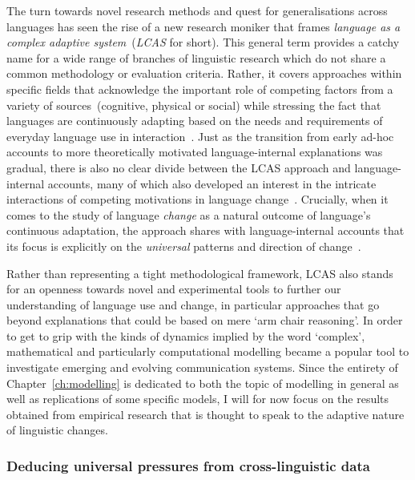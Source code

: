 The turn towards novel research methods and quest for generalisations across languages has seen the rise of a new research moniker that frames \emph{language as a complex adaptive system}~(\emph{LCAS} for short). This general term provides a catchy name for a wide range of branches of linguistic research which do not share a common methodology or evaluation criteria. Rather, it covers approaches within specific fields that acknowledge the important role of competing factors from a variety of sources~(cognitive, physical or social) while stressing the fact that languages are continuously adapting based on the needs and requirements of everyday language use in interaction~\citep{LCAS2009}. Just as the transition from early ad-hoc accounts to more theoretically motivated language-internal explanations was gradual, there is also no clear divide between the LCAS approach and language-internal accounts, many of which also developed an interest in the intricate interactions of competing motivations in language change~\citep{Berg1998,Thomsen2006,MacWhinney2014}.
Crucially, when it comes to the study of language \emph{change} as a natural outcome of language's continuous adaptation, the approach shares with language-internal accounts that its focus is explicitly on the \emph{universal} patterns and direction of change~\citep[p.4-5]{LCAS2009}.

Rather than representing a tight methodological framework, LCAS also stands for an openness towards novel and experimental tools to further our understanding of language use and change, in particular approaches that go beyond explanations that could be based on mere `arm chair reasoning'. In order to get to grip with the kinds of dynamics implied by the word `complex', mathematical and particularly computational modelling became a popular tool to investigate emerging and evolving communication systems. Since the entirety of Chapter~\ref{ch:modelling} is dedicated to both the topic of modelling in general as well as replications of some specific models, I will for now focus on the results obtained from empirical research that is thought to speak to the adaptive nature of linguistic changes.

\subsubsection{Deducing universal pressures from cross-linguistic data}

